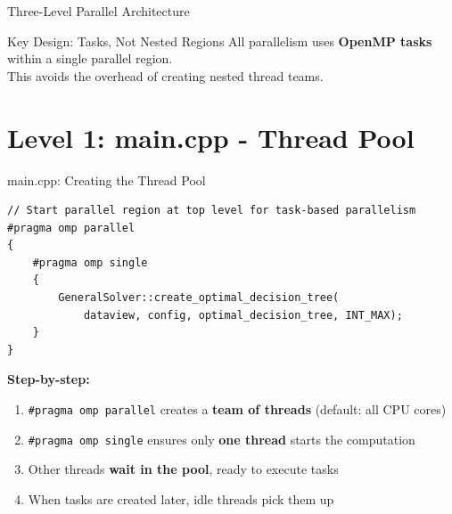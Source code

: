 \documentclass{beamer}
\begin{document}
\begin{frame}{Three-Level Parallel Architecture}
\begin{center}
\end{center}

\begin{block}{Key Design: Tasks, Not Nested Regions}
All parallelism uses \textbf{OpenMP tasks} within a single parallel region.\\
This avoids the overhead of creating nested thread teams.
\end{block}
\end{frame}

\section{Level 1: main.cpp - Thread Pool}

\begin{frame}[fragile]{main.cpp: Creating the Thread Pool}
\begin{lstlisting}
// Start parallel region at top level for task-based parallelism
#pragma omp parallel
{
    #pragma omp single
    {
        GeneralSolver::create_optimal_decision_tree(
            dataview, config, optimal_decision_tree, INT_MAX);
    }
}
\end{lstlisting}

\vspace{0.5em}
\textbf{Step-by-step:}
\begin{enumerate}
    \item \texttt{\#pragma omp parallel} creates a \textbf{team of threads} (default: all CPU cores)
    \item \texttt{\#pragma omp single} ensures only \textbf{one thread} starts the computation
    \item Other threads \textbf{wait in the pool}, ready to execute tasks
    \item When tasks are created later, idle threads pick them up
\end{enumerate}
\end{frame}
\end{document}
